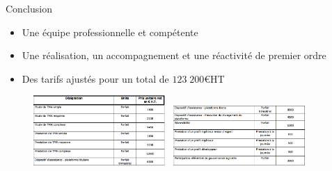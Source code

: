 \ZacSpeak
\begin{frame}{Conclusion}
	\begin{itemize}
		\item Une équipe professionnelle et compétente
		\item Une réalisation, un accompagnement et une réactivité de premier ordre
		\item Des tarifs ajustés pour un total de $123\;200$\euro{}HT
	\end{itemize}
	\begin{figure}[H]
		\hspace{-10px}
		\includegraphics[width=5cm]{tarif1.png}~
		\includegraphics[width=5cm]{tarif2.png}
	\end{figure}
\end{frame}
